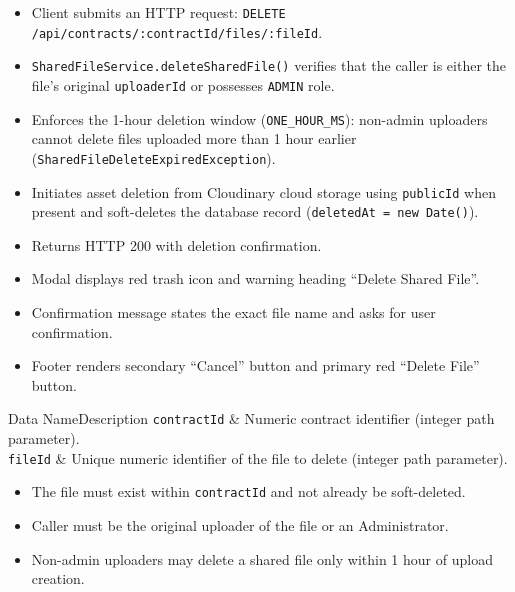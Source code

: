 \begin{itemize}[leftmargin=1.6em,topsep=3pt,itemsep=2pt,parsep=0pt,label=$\bullet$]
      \item Client submits an HTTP request: \texttt{DELETE /\allowbreak{}api/\allowbreak{}contracts/\allowbreak{}:\allowbreak{}contractId/\allowbreak{}files/\allowbreak{}:\allowbreak{}fileId}.
      \item \texttt{SharedFileService.deleteSharedFile()} verifies that the caller is either the file's original \texttt{uploaderId} or possesses \texttt{ADMIN} role.
      \item Enforces the 1-hour deletion window (\texttt{ONE\_HOUR\_MS}): non-admin uploaders cannot delete files uploaded more than 1 hour earlier (\texttt{SharedFileDeleteExpiredException}).
      \item Initiates asset deletion from Cloudinary cloud storage using \texttt{publicId} when present and soft-deletes the database record (\texttt{deletedAt = new Date()}).
      \item Returns HTTP 200 with deletion confirmation.
\end{itemize}

\begin{itemize}[leftmargin=1.6em,topsep=3pt,itemsep=2pt,parsep=0pt,label=$\bullet$]
      \item Modal displays red trash icon and warning heading ``Delete Shared File''.
      \item Confirmation message states the exact file name and asks for user confirmation.
      \item Footer renders secondary ``Cancel'' button and primary red ``Delete File'' button.
\end{itemize}


\begin{specdatatable}{Data Name}{Description}
      \texttt{contractId} & Numeric contract identifier (integer path parameter).\\ \hline
      \texttt{fileId} & Unique numeric identifier of the file to delete (integer path parameter).\\ \hline
\end{specdatatable}

\begin{itemize}[leftmargin=1.6em,topsep=3pt,itemsep=2pt,parsep=0pt,label=$\bullet$]
      \item The file must exist within \texttt{contractId} and not already be soft-deleted.
      \item Caller must be the original uploader of the file or an Administrator.
      \item Non-admin uploaders may delete a shared file only within 1 hour of upload creation.
\end{itemize}

